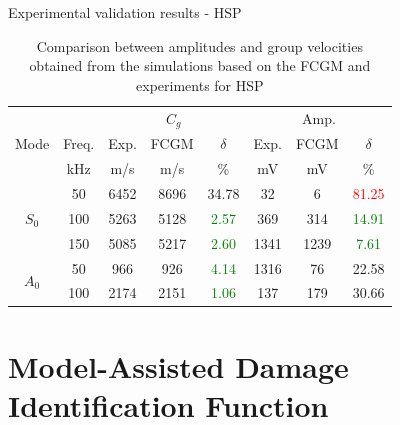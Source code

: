 \documentclass[10pt]{beamer} %
\begin{document}
	\begin{frame}[label=frame14]{Experimental validation results - HSP}

		\begin{table}

			\centering

			\caption{\label{tab:group_velocity_hsp} Comparison between amplitudes and group velocities obtained from the simulations based on the FCGM and experiments for HSP}

			\begin{tabular}{cccccccc}

				\toprule

				& & \multicolumn{3}{c}{\(C_g\)} & \multicolumn{3}{c}{Amp.}\\

				Mode & Freq. & Exp. & FCGM & \(\delta\) & Exp. & FCGM & \(\delta\)\\

				& kHz & m/s & m/s & \% & mV & mV & \%\\

				\midrule

				\multirow{3}{*}{$S_0$} & 50 & 6452 & 8696 & {34.78}& 32 & 6 & \textcolor{red}{81.25}\\

				&100& 5263 & 5128 & \textcolor{green}{2.57}& 369 & 314 & \textcolor{green}{14.91}\\

				&150& 5085 & 5217 & \textcolor{green}{2.60}& 1341 & 1239 & \textcolor{green}{7.61}\\

				\midrule

				\multirow{2}{*}{$A_0$} & 50 & 966 & 926 & \textcolor{green}{4.14} & 1316& 76 & {22.58}\\

				& 100 & 2174 & 2151 & \textcolor{green}{1.06} & 137 & 179 & {30.66}\\

				\bottomrule

			\end{tabular}

		\end{table}

	\end{frame}

	\section{Model-Assisted Damage Identification Function}
\end{document}
